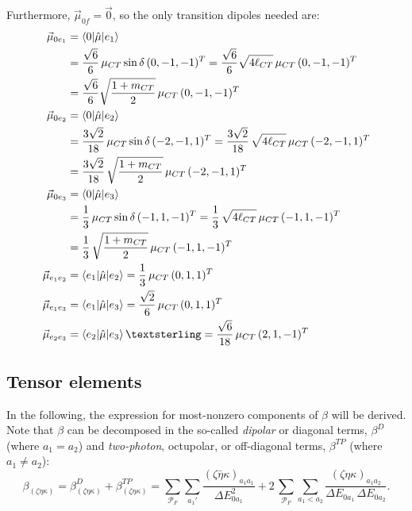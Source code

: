 \documentclass[journal=jpcafh]{achemso}
\begin{document}
Furthermore, $\vec\mu_{0f}=\vec{0}$, so  the only transition dipoles needed are:\begin{align}
	\vec\mu_{0e_1} &= \braket{0|\hat{\mu}|e_1} \nonumber\\
	&= \frac{\sqrt{6}}{6}\,\mu_{CT}\sin\delta\,(0, -1, -1)^T
	= \frac{\sqrt{6}}{6}\sqrt{4\ell_{CT}}\,\mu_{CT}\,(0, -1, -1)^T\nonumber\\
	&= \frac{\sqrt{6}}{6}\sqrt{\frac{1+m_{CT}}{2}}\,\mu_{CT}\,(0, -1, -1)^T\\
	\vec\mu_{0e_2} &= \braket{0|\hat{\mu}|e_2} \nonumber\\ %
	&= \frac{3\sqrt{2}}{18}\,\mu_{CT}\sin\delta\,(-2, -1, 1)^T= \frac{3\sqrt{2}}{18}\,\sqrt{4\ell_{CT}}\,\mu_{CT}\,(-2, -1, 1)^T\nonumber\\
	&= \frac{3\sqrt{2}}{18}\,\sqrt{\frac{1+m_{CT}}{2}}\,\mu_{CT}\,(-2, -1, 1)^T\\
	\vec\mu_{0e_3} &= \braket{0|\hat{\mu}|e_3}\nonumber\\ %
	&= \frac{1}{3}\,\mu_{CT}\sin\delta\,(-1, 1, -1)^T= \frac{1}{3}\,\sqrt{4\ell_{CT}}\,\mu_{CT}\,(-1, 1, -1)^T\nonumber\\
	&= \frac{1}{3}\,\sqrt{\frac{1+m_{CT}}{2}}\,\mu_{CT}\,(-1, 1, -1)^T\\
	\vec\mu_{e_1e_2} &= \braket{e_1|\hat{\mu}|e_2} %
	= \frac{1}{3}\,\mu_{CT}\,(0, 1, 1)^T \\
	\vec\mu_{e_1e_3} &= \braket{e_1|\hat{\mu}|e_3} %
	= \frac{\sqrt{2}}{6}\,\mu_{CT}\,(0, 1, 1)^T \\
	\vec\mu_{e_2e_3} &= \braket{e_2|\hat{\mu}|e_3} £
	= \frac{\sqrt{6}}{18}\,\mu_{CT}\,(2, 1, -1)^T
\end{align}

\subsection{Tensor elements}

In the following, the expression for most-nonzero components of $\beta$ will be derived.
Note that $\beta$ can be decomposed in the so-called \textit{dipolar} or diagonal terms, $\beta^D$ (where $a_1=a_2$) and \textit{two-photon}, octupolar, or off-diagonal terms, $\beta^{TP}$ (where $a_1\neq a_2$):\begin{equation}
	\beta_{(\zeta\eta\kappa)} = \beta^D_{(\zeta\eta\kappa)} + \beta^{TP}_{(\zeta\eta\kappa)}  =  \sum_{\mathcal{P}_F} \sum_{a_1'} \frac{(\zeta\bar{\eta}\kappa)_{a_1 a_1}}{\Delta E_{0a_1}^2} + 2\, \sum_{\mathcal{P}_F}\sum_{a_1< a_2} \frac{(\zeta\eta\kappa)_{a_1 a_2}}{\Delta E_{0a_1}\,\Delta E_{0a_2}}.
\end{equation}
\end{document}
